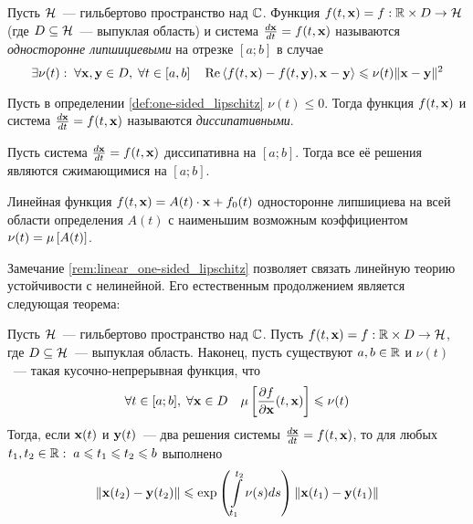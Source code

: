 \begin{definition}
    \label{def:one-sided_lipschitz}
    Пусть $ \mathcal{H} $~--- гильбертово пространство над $ \mathbb{C} $.
    Функция $ f(t, \mathbf{x}) = f: \mathbb{R} \times D \to \mathcal{H} $
    (где $ D \subseteq \mathcal{H} $~--- выпуклая область)
    и система $ \frac{d \mathbf{x}}{d t} = f(t, \mathbf{x}) $ называются \emph{односторонне липшициевыми} на отрезке $ [a; b] $ в случае
    \[
        \exists \nu(t): \; \forall \mathbf{x}, \mathbf{y} \in D, \; \forall t \in [a, b] \quad
        \operatorname{Re} \left\langle f(t, \mathbf{x}) - f(t, \mathbf{y}), \mathbf{x} - \mathbf{y} \right\rangle \leqslant \nu(t) \| \mathbf{x} - \mathbf{y} \|^2
    \]
\end{definition}

\begin{definition}
    \label{def:dissipative}
    Пусть в определении \ref{def:one-sided_lipschitz} $ \nu(t) \leqslant 0 $.
    Тогда функция $ f(t, \mathbf{x}) $ и система $ \frac{d \mathbf{x}}{d t} = f(t, \mathbf{x}) $ называются \emph{диссипативными}.
\end{definition}

\begin{statement}
    \label{def:contractivity_condition}
    Пусть система $ \frac{d \mathbf{x}}{d t} = f(t, \mathbf{x}) $ диссипативна на $ [a; b] $.
    Тогда все её решения являются сжимающимися на $ [a; b] $.
\end{statement}

\begin{remark}
    \label{rem:linear_one-sided_lipschitz}
    Линейная функция $ f(t, \mathbf{x}) = A(t) \cdot \mathbf{x} + f_0(t) $ односторонне липшициева на всей области определения $ A(t) $
    с наименьшим возможным коэффициентом $ \nu(t) = \mu \left[ A(t) \right] $.
\end{remark}

Замечание \ref{rem:linear_one-sided_lipschitz} позволяет связать линейную теорию устойчивости с нелинейной.
Его естественным продолжением является следующая теорема:

\begin{theorem}[Далквист, 1959]
    \label{thm:nonlinear_to_linear}
    Пусть $ \mathcal{H} $~--- гильбертово пространство над $ \mathbb{C} $.
    Пусть $ f(t, \mathbf{x}) = f: \mathbb{R} \times D \to \mathcal{H} $,
    где $ D \subseteq \mathcal{H} $~--- выпуклая область.
    Наконец, пусть существуют $ a, b \in \mathbb{R} $ и $ \nu(t) $~--- такая кусочно-непрерывная функция, что
    \[
        \forall t \in [a; b], \; \forall \mathbf{x} \in D \quad \mu \left[ \frac{\partial f}{\partial \mathbf{x}}(t, \mathbf{x}) \right] \leqslant \nu(t)
    \]
    Тогда, если $ \mathbf{x}(t) $ и $ \mathbf{y}(t) $~--- два решения системы $ \frac{d \mathbf{x}}{d t} = f(t, \mathbf{x}) $,
    то для любых $ t_1, t_2 \in \mathbb{R}: \; a \leqslant t_1 \leqslant t_2 \leqslant b $ выполнено
    \[
        \| \mathbf{x}(t_2) - \mathbf{y}(t_2) \| \leqslant \exp\left( \int\limits_{t_1}^{t_2} \nu(s) ds \right) \| \mathbf{x}(t_1) - \mathbf{y}(t_1) \|
    \]
\end{theorem}

